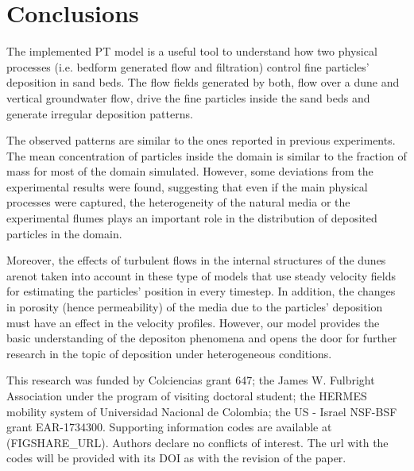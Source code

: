 \documentclass[draft,linenumbers]{agujournal2018}
\begin{document}
\section{Conclusions} \label{Conclusions}

The implemented PT model is a useful tool to understand how two physical processes (i.e. bedform generated flow and filtration) control fine particles' deposition in sand beds. The flow fields generated by both, flow over a dune and vertical groundwater flow, drive the fine particles inside the sand beds and generate irregular deposition patterns. 

The observed patterns are similar to the ones reported in previous experiments. The mean concentration of particles inside the domain is similar to the fraction of mass for most of the domain simulated. However, some deviations from the experimental results were found, suggesting that even if the main physical processes were captured, the heterogeneity of the natural media or the experimental flumes plays an important role in the distribution of deposited particles in the domain. 

Moreover, the effects of turbulent flows in the internal structures of the dunes arenot taken into account in these type of models that use steady velocity fields for estimating the particles' position in every timestep. In addition, the changes in porosity (hence permeability) of the media due to the particles' deposition must have an effect in the velocity profiles. However, our model provides the basic understanding of the depositon phenomena and opens the door for further research in the topic of deposition under heterogeneous conditions. 

\acknowledgments
This research was funded by Colciencias grant 647; the James W. Fulbright Association under the program of visiting doctoral student; the HERMES mobility system of Universidad Nacional de Colombia; the US - Israel NSF-BSF grant EAR-1734300. Supporting information codes are available at (FIGSHARE\_URL). Authors declare no conflicts of interest.
The url with the codes will be provided with its DOI as with the revision of the paper. 



\end{document}

